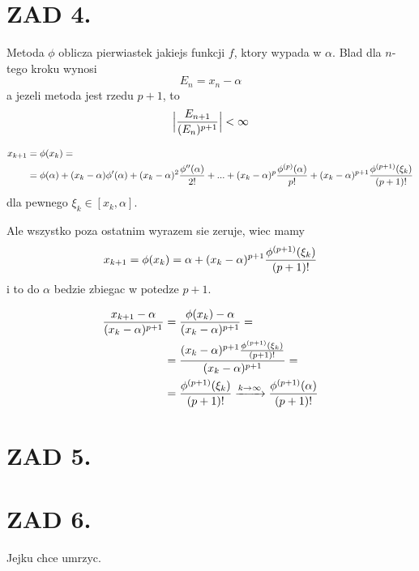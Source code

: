 \documentclass{article}[16pt]
\begin{document}
    \section*{ZAD 4.}

    Metoda $\phi$ oblicza pierwiastek jakiejs funkcji $f$, ktory wypada w $\alpha$. Blad dla $n$-tego kroku wynosi
    $$E_n=x_n-\alpha$$
    a jezeli metoda jest rzedu $p+1$, to
    \begin{align*}
        \Big |{E_{n+1}\over (E_n)^{p+1}}\Big |< \infty
    \end{align*}

    \begin{align*}
        x_{k+1}&=\phi(x_k)=\\
        &=\phi(\alpha)+(x_k-\alpha)\phi'(\alpha)+(x_k-\alpha)^2{\phi''(\alpha)\over 2!}+...+(x_k-\alpha)^p{\phi^{(p)}(\alpha)\over p!}+(x_k-\alpha)^{p+1}{\phi^{(p+1)}(\xi_k)\over (p+1)!}
    \end{align*}
    dla pewnego $\xi_k\in[x_k,\alpha]$.
    \medskip

    Ale wszystko poza ostatnim wyrazem sie zeruje, wiec mamy
    $$x_{k+1}=\phi(x_k)=\alpha+(x_k-\alpha)^{p+1}{\phi^{(p+1)}(\xi_k)\over(p+1)!}$$
    i to do $\alpha$ bedzie zbiegac w potedze $p+1$.

    \begin{align*}
        {x_{k+1}-\alpha\over (x_k-\alpha)^{p+1}}&={\phi(x_k)-\alpha\over (x_k-\alpha)^{p+1}}=\\
        &={(x_k-\alpha)^{p+1}{\phi^{(p+1)}(\xi_k)\over(p+1)!}\over (x_k-\alpha)^{p+1}}=\\
        &={\phi^{(p+1)}(\xi_k)\over(p+1)!}\xrightarrow[]{k\to\infty}{\phi^{(p+1)}(\alpha)\over(p+1)!}
    \end{align*}

    
    \section*{ZAD 5.}

    


    \section*{ZAD 6.}

    Jejku chce umrzyc.
\end{document}
